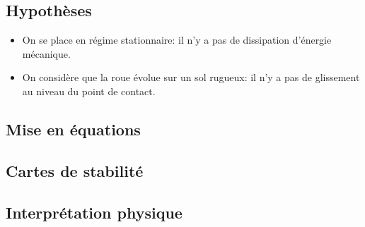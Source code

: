 \subsection{Hypothèses}
\begin{itemize}
    \item On se place en régime stationnaire: il n'y a pas de dissipation d'énergie mécanique. 
    \item On considère que la roue évolue sur un sol rugueux: il n'y a pas de glissement au niveau du point de contact.
\end{itemize}

\subsection{Mise en équations}


\subsection{Cartes de stabilité}

\subsection{Interprétation physique}









































